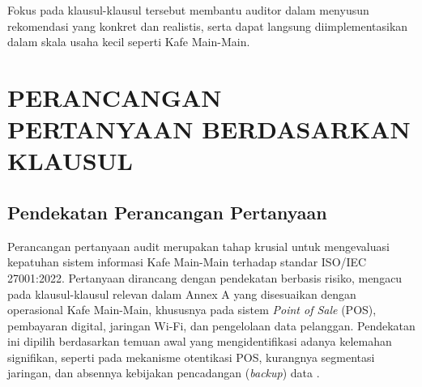 \documentclass[12pt, a4paper]{report}
\begin{document}
Fokus pada klausul-klausul tersebut membantu auditor dalam menyusun rekomendasi yang konkret dan realistis, serta dapat langsung diimplementasikan dalam skala usaha kecil seperti Kafe Main-Main.

\chapter{PERANCANGAN PERTANYAAN BERDASARKAN KLAUSUL}
\label{bab:pertanyaan}


\section{Pendekatan Perancangan Pertanyaan}

Perancangan pertanyaan audit merupakan tahap krusial untuk mengevaluasi kepatuhan sistem informasi Kafe Main-Main terhadap standar ISO/IEC 27001:2022. Pertanyaan dirancang dengan pendekatan berbasis risiko, mengacu pada klausul-klausul relevan dalam Annex A yang disesuaikan dengan operasional Kafe Main-Main, khususnya pada sistem \textit{Point of Sale} (POS), pembayaran digital, jaringan Wi-Fi, dan pengelolaan data pelanggan. Pendekatan ini dipilih berdasarkan temuan awal yang mengidentifikasi adanya kelemahan signifikan, seperti pada mekanisme otentikasi POS, kurangnya segmentasi jaringan, dan absennya kebijakan pencadangan (\textit{backup}) data \citep{auditakademik2015}.
\end{document}

